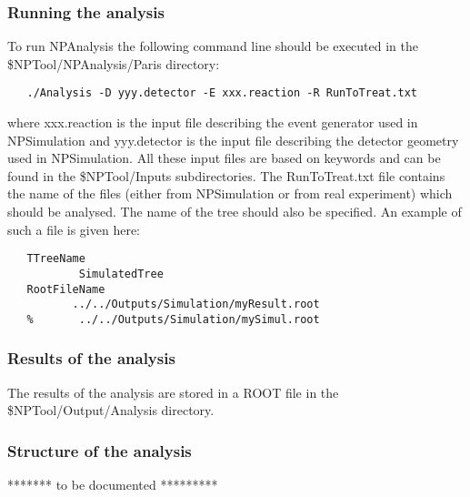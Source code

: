 \documentclass[a4paper,12pt]{article}
\begin{document}
\subsubsection{Running the analysis}
To run NPAnalysis the following command line should be executed in the 
\$NPTool/NPAnalysis/Paris directory:

\begin{verbatim}
   ./Analysis -D yyy.detector -E xxx.reaction -R RunToTreat.txt
\end{verbatim}

where xxx.reaction is the input file describing the event generator used in 
NPSimulation and yyy.detector is the input file describing the detector geometry
used in NPSimulation. All these input files are based on keywords and can be found 
in the \$NPTool/Inputs subdirectories. The RunToTreat.txt file contains the
name of the files (either from NPSimulation or from real experiment) which should
be analysed. The name of the tree should also be specified. An example 
of such a file is given here:

\begin{verbatim}
   TTreeName
           SimulatedTree
   RootFileName
          ../../Outputs/Simulation/myResult.root
   %       ../../Outputs/Simulation/mySimul.root
\end{verbatim}


\subsubsection{Results of the analysis}
The results of the analysis are stored in a ROOT file in the \$NPTool/Output/Analysis
directory.


\subsubsection{Structure of the analysis}
******* to be documented *********
\end{document}
